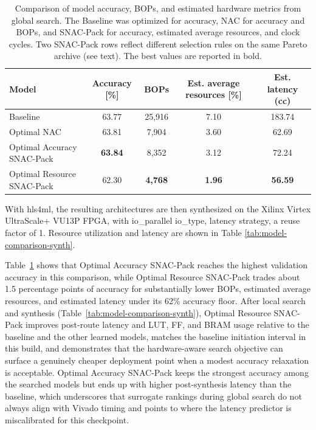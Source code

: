 \documentclass[11pt]{article}
\begin{document}
\begin{table}[t]
  \caption{Comparison of model accuracy, BOPs, and estimated hardware metrics from global search. The Baseline was optimized for accuracy, NAC for accuracy and BOPs, and SNAC-Pack for accuracy, estimated average resources, and clock cycles. Two SNAC-Pack rows reflect different selection rules on the same Pareto archive (see text). The best values are reported in bold.}
  \label{tab:mlp-global-comparison}
  \centering
  \footnotesize
  \begin{tabular}{lcccc}
    \toprule
    Model & Accuracy [\%] & BOPs & Est. average resources [\%]& Est. latency (cc) \\
    \midrule
    Baseline \cite{Odagiu_2024}          & 63.77 & 25{,}916 & 7.10 & 183.74 \\
    Optimal NAC \cite{Weitz_2025}      & 63.81 & 7{,}904  & 3.60   & 62.69 \\
    Optimal Accuracy SNAC-Pack & \textbf{63.84} & 8{,}352  & 3.12 & 72.24 \\
    Optimal Resource SNAC-Pack & 62.30 & \textbf{4{,}768} & \textbf{1.96} & \textbf{56.59} \\
    \bottomrule
  \end{tabular}
\end{table}

With hls4ml, the resulting architectures are then synthesized on the Xilinx Virtex UltraScale+ VU13P FPGA, with io\_parallel io\_type, latency strategy, a reuse factor of 1. Resource utilization and latency are shown in Table \ref{tab:model-comparison-synth}.


Table~\ref{tab:mlp-global-comparison} shows that Optimal Accuracy SNAC-Pack reaches the highest validation accuracy in this comparison, while Optimal Resource SNAC-Pack trades about 1.5 percentage points of accuracy for substantially lower BOPs, estimated average resources, and estimated latency under its 62\% accuracy floor.
After local search and synthesis (Table~\ref{tab:model-comparison-synth}), Optimal Resource SNAC-Pack improves post-route latency and LUT, FF, and BRAM usage relative to the baseline and the other learned models, matches the baseline initiation interval in this build, and demonstrates that the hardware-aware search objective can surface a genuinely cheaper deployment point when a modest accuracy relaxation is acceptable.
Optimal Accuracy SNAC-Pack keeps the strongest accuracy among the searched models but ends up with higher post-synthesis latency than the baseline, which underscores that surrogate rankings during global search do not always align with Vivado timing and points to where the latency predictor is miscalibrated for this checkpoint.
\end{document}
